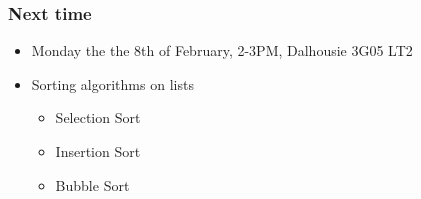 \documentclass[final,handout]{beamer}
\begin{document}




\begin{frame}
    \frametitle{Next time}

    \begin{itemize}
        \item Monday the the 8th of February, 2-3PM,
            Dalhousie 3G05 LT2
        
        \item Sorting algorithms on lists
            \begin{itemize}
                \item Selection Sort
                \item Insertion Sort
                \item Bubble Sort
            \end{itemize}

    \end{itemize}

\end{frame}
\end{document}
